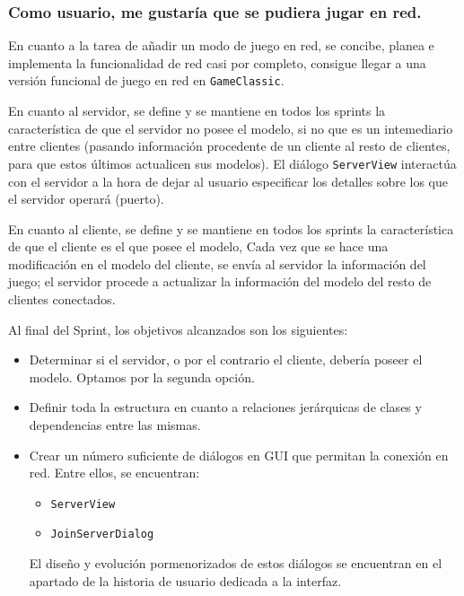 \documentclass[../DocumentoOficial.tex]{subfiles}
\begin{document}
\newpage

\subsubsection{Como usuario, me gustaría que se pudiera jugar en red.}
\begin{sprint}[5]
En cuanto a la tarea de añadir un modo de juego en red, se concibe, planea e implementa la funcionalidad de red casi por completo, consigue llegar a una versión funcional de juego en red en \texttt{GameClassic}.

En cuanto al servidor, se define y se mantiene en todos los sprints la característica de que el servidor no posee el modelo, si no que es un intemediario entre clientes (pasando información procedente de un cliente al resto de clientes, para que estos últimos actualicen sus modelos). El diálogo \texttt{ServerView} interactúa con el servidor a la hora de dejar al usuario especificar los detalles sobre los que el servidor operará (puerto).

En cuanto al cliente, se define y se mantiene en todos los sprints la característica de que el cliente es el que posee el modelo, Cada vez que se hace una modificación en el modelo del cliente, se envía al servidor la información del juego; el servidor procede a actualizar la información del modelo del resto de clientes conectados.

Al final del Sprint, los objetivos alcanzados son los siguientes:

\begin{itemize}
\item Determinar si el servidor, o por el contrario el cliente, debería poseer el modelo. Optamos por la segunda opción.

\item Definir toda la estructura en cuanto a relaciones jerárquicas de clases y dependencias entre las mismas.

\item Crear un número suficiente de diálogos en GUI que permitan la conexión en red. Entre ellos, se encuentran:
\begin{itemize}
\item \texttt{ServerView}
\item \texttt{JoinServerDialog}
\end{itemize}

El diseño y evolución pormenorizados de estos diálogos se encuentran en el apartado de la historia de usuario dedicada a la interfaz.


\end{itemize}
\end{sprint}
\end{document}
